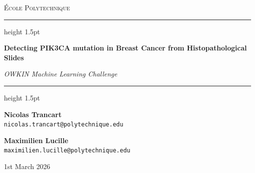 \documentclass[11pt,a4paper]{article}
\begin{document}
\begin{titlepage}
    \centering
    \vspace*{3cm}
    
    {\scshape\Large École Polytechnique \par}
    \vspace{2cm}
    
    \hrule height 1.5pt
    \vspace{1.5cm}
    {\huge\bfseries Detecting PIK3CA mutation in Breast Cancer from Histopathological Slides\par}
    \vspace{1cm}
    {\LARGE\itshape OWKIN Machine Learning Challenge\par}
    \vspace{1.5cm}
    \hrule height 1.5pt
    \vspace{3cm}
    
    {\Large\textbf{Nicolas Trancart} \\[-0.2em]
    \normalsize\texttt{nicolas.trancart@polytechnique.edu}\par}
    \vspace{1cm}
    
    {\Large\textbf{Maximilien Lucille} \\[-0.2em]
    \normalsize\texttt{maximilien.lucille@polytechnique.edu}\par}
    
    \vfill
    {\Large 1st March 2026\par}
\end{titlepage}
\end{document}
